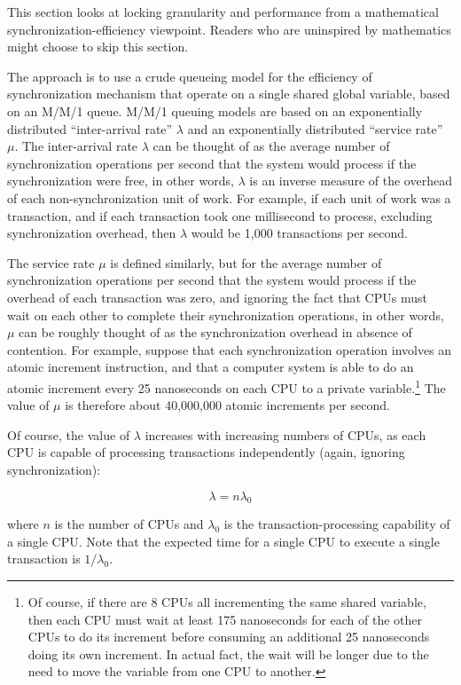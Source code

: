 This section looks at locking granularity and performance from
a mathematical synchronization-efficiency viewpoint.
Readers who are uninspired by mathematics might choose to skip
this section.

The approach is to use a crude queueing model for the efficiency of
synchronization mechanism that operate on a single shared global
variable, based on an M/M/1 queue.
M/M/1 queuing models are based on an exponentially distributed
``inter-arrival rate'' $\lambda$ and an exponentially distributed
``service rate'' $\mu$.
The inter-arrival rate $\lambda$ can be thought of as the average
number of synchronization operations per second that the system
would process if the synchronization were free, in other words,
$\lambda$ is an inverse measure of the overhead of each non-synchronization
unit of work.
For example, if each unit of work was a transaction, and if each transaction
took one millisecond to process, excluding synchronization overhead,
then $\lambda$ would be 1,000 transactions per second.

The service rate $\mu$ is defined similarly, but for the average
number of synchronization operations per second that the system
would process if the overhead of each transaction was zero, and
ignoring the fact that CPUs must wait on each other to complete
their synchronization operations, in other words, $\mu$ can be roughly
thought of as the synchronization overhead in absence of contention.
For example, suppose that each synchronization operation involves an atomic
increment instruction, and that a computer system is able to do
an atomic increment every 25 nanoseconds on each CPU
to a private variable.\footnote{
	Of course, if there are 8 CPUs all incrementing the same
	shared variable, then each CPU must wait at least 175 nanoseconds
	for each of the other CPUs to do its increment before consuming
	an additional 25 nanoseconds doing its own increment.
	In actual fact, the wait will be longer due to the need
	to move the variable from one CPU to another.}
The value of $\mu$ is therefore about 40,000,000 atomic increments
per second.

Of course, the value of $\lambda$ increases with increasing numbers of
CPUs, as each CPU is capable of processing transactions independently
(again, ignoring synchronization):

\begin{equation}
	\lambda = n \lambda_0
\end{equation}

where $n$ is the number of CPUs and $\lambda_0$ is the transaction-processing
capability of a single CPU.
Note that the expected time for a single CPU to execute a single transaction
is $1 / \lambda_0$.


